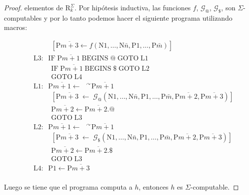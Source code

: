 \begin{proof}
    \PN elementos de $\mathrm{R}_{k}^{\Sigma}$. Por hipótesis inductiva, las funciones $f$, $\mathcal{G}_{@}$,
    $\mathcal{G}_{\$}$, son $\Sigma$-computables y por lo tanto podemos hacer el siguiente programa utilizando macros:

    \begin{eqnarray*}
      && \qquad\;\;       \left[\mathrm{P}\overline{m+3} \leftarrow f(\mathrm{N}1,\dotsc,\mathrm{N}\bar{n},\mathrm{P}1,
                          \dotsc,\mathrm{P}\bar{m})\right] \\
      && \mathrm{L}3:\;\; \mathrm{IF}\;\mathrm{P}\overline{m+1}\; \text{BEGINS}\;@\; \mathrm{GOTO}\;\mathrm{L}1 \\
      && \qquad\;\;       \mathrm{IF}\;\mathrm{P}\overline{m+1}\; \text{BEGINS}\;\$\; \mathrm{GOTO}\;\mathrm{L}2 \\
      && \qquad\;\;       \mathrm{GOTO}\; \mathrm{L}4\\
      && \mathrm{L}1:\;\; \mathrm{P}\overline{m+1} \leftarrow \text{ }^{\curvearrowright } \mathrm{P}\overline{m+1} \\
      && \qquad\;\;       \left[ \mathrm{P}\overline{m+3}\; \leftarrow\; \mathcal{G}_{@}
                                (\mathrm{N} 1,\dotsc,\mathrm{N}\bar{n},
                                \mathrm{P}1,\dotsc,\mathrm{P}\bar{m},\mathrm{P} \overline{m+2},\mathrm{P}\overline{m+3})
                          \right] \\
      && \qquad\;\;       \mathrm{P}\overline{m+2}\leftarrow \mathrm{P}\overline{m+2}.@  \\
      && \qquad\;\;       \mathrm{GOTO}\;\mathrm{L}3 \\
      && \mathrm{L}2:\;\; \mathrm{P}\overline{m+1} \leftarrow \text{ }^{\curvearrowright } \mathrm{P}\overline{m+1} \\
      && \qquad\;\;       \left[ \mathrm{P}\overline{m+3}\; \leftarrow\; \mathcal{G}_{\$}
                                (\mathrm{N} 1,\dotsc,\mathrm{N}\bar{n},
                                \mathrm{P}1,\dotsc,\mathrm{P}\bar{m},\mathrm{P} \overline{m+2},\mathrm{P}\overline{m+3})
                          \right] \\
      && \qquad\;\;       \mathrm{P}\overline{m+2}\leftarrow \mathrm{P}\overline{m+2}.\$ \\
      && \qquad\;\;       \mathrm{GOTO}\;\mathrm{L}3 \\
      && \mathrm{L}4:\;\; \mathrm{P}1\leftarrow \mathrm{P}\overline{m+3} \\
    \end{eqnarray*}

    \PN Luego se tiene que el programa computa a $h$, entonces $h$ es $\Sigma$-computable.
  \end{proof}

